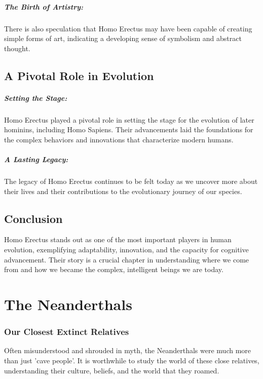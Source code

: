 \documentclass[a4paper,12pt]{book}
\begin{document}
\paragraph{The Birth of Artistry:}
There is also speculation that Homo Erectus may have been capable of creating simple forms of art, indicating a developing sense of symbolism and abstract thought.

\section*{A Pivotal Role in Evolution}

\paragraph{Setting the Stage:}
Homo Erectus played a pivotal role in setting the stage for the evolution of later hominins, including Homo Sapiens. Their advancements laid the foundations for the complex behaviors and innovations that characterize modern humans.

\paragraph{A Lasting Legacy:}
The legacy of Homo Erectus continues to be felt today as we uncover more about their lives and their contributions to the evolutionary journey of our species.

\section*{Conclusion}

Homo Erectus stands out as one of the most important players in human evolution, exemplifying adaptability, innovation, and the capacity for cognitive advancement. Their story is a crucial chapter in understanding where we come from and how we became the complex, intelligent beings we are today.

\chapter{The Neanderthals}
\subsection*{Our Closest Extinct Relatives}
Often misunderstood and shrouded in myth, the Neanderthals were much more than just 'cave people'. It is worthwhile to study the world of these close relatives, understanding their culture, beliefs, and the world that they roamed.
\end{document}
